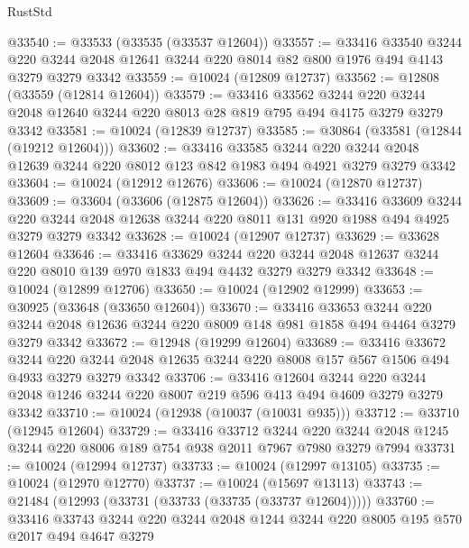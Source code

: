 \begin{lexlean}{RustStd}
\begin{coremodule}
{\begin{coremodule}
{{{{{{{{{{{{{{{{{{{{{{{{{{@33540 := @33533 (@33535 (@33537 @12604))
@33557 := @33416
    @33540
    @3244
    @220
    @3244
    @2048
    @12641
    @3244
    @220
    @8014
    @82
    @800
    @1976
    @494
    @4143
    @3279
    @3279
    @3342
@33559 := @10024 (@12809 @12737)
@33562 := @12808 (@33559 (@12814 @12604))
@33579 := @33416
    @33562
    @3244
    @220
    @3244
    @2048
    @12640
    @3244
    @220
    @8013
    @28
    @819
    @795
    @494
    @4175
    @3279
    @3279
    @3342
@33581 := @10024 (@12839 @12737)
@33585 := @30864 (@33581 (@12844 (@19212 @12604)))
@33602 := @33416
    @33585
    @3244
    @220
    @3244
    @2048
    @12639
    @3244
    @220
    @8012
    @123
    @842
    @1983
    @494
    @4921
    @3279
    @3279
    @3342
@33604 := @10024 (@12912 @12676)
@33606 := @10024 (@12870 @12737)
@33609 := @33604 (@33606 (@12875 @12604))
@33626 := @33416
    @33609
    @3244
    @220
    @3244
    @2048
    @12638
    @3244
    @220
    @8011
    @131
    @920
    @1988
    @494
    @4925
    @3279
    @3279
    @3342
@33628 := @10024 (@12907 @12737)
@33629 := @33628 @12604
@33646 := @33416
    @33629
    @3244
    @220
    @3244
    @2048
    @12637
    @3244
    @220
    @8010
    @139
    @970
    @1833
    @494
    @4432
    @3279
    @3279
    @3342
@33648 := @10024 (@12899 @12706)
@33650 := @10024 (@12902 @12999)
@33653 := @30925 (@33648 (@33650 @12604))
@33670 := @33416
    @33653
    @3244
    @220
    @3244
    @2048
    @12636
    @3244
    @220
    @8009
    @148
    @981
    @1858
    @494
    @4464
    @3279
    @3279
    @3342
@33672 := @12948 (@19299 @12604)
@33689 := @33416
    @33672
    @3244
    @220
    @3244
    @2048
    @12635
    @3244
    @220
    @8008
    @157
    @567
    @1506
    @494
    @4933
    @3279
    @3279
    @3342
@33706 := @33416
    @12604
    @3244
    @220
    @3244
    @2048
    @1246
    @3244
    @220
    @8007
    @219
    @596
    @413
    @494
    @4609
    @3279
    @3279
    @3342
@33710 := @10024 (@12938 (@10037 (@10031 @935)))
@33712 := @33710 (@12945 @12604)
@33729 := @33416
    @33712
    @3244
    @220
    @3244
    @2048
    @1245
    @3244
    @220
    @8006
    @189
    @754
    @938
    @2011
    @7967
    @7980
    @3279
    @7994
@33731 := @10024 (@12994 @12737)
@33733 := @10024 (@12997 @13105)
@33735 := @10024 (@12970 @12770)
@33737 := @10024 (@15697 @13113)
@33743 := @21484 (@12993 (@33731 (@33733 (@33735 (@33737 @12604)))))
@33760 := @33416
    @33743
    @3244
    @220
    @3244
    @2048
    @1244
    @3244
    @220
    @8005
    @195
    @570
    @2017
    @494
    @4647
    @3279
}}}}}}}}}}}}}}}}}}}}}}}}}}
\end{coremodule}}
\end{coremodule}
\end{lexlean}
